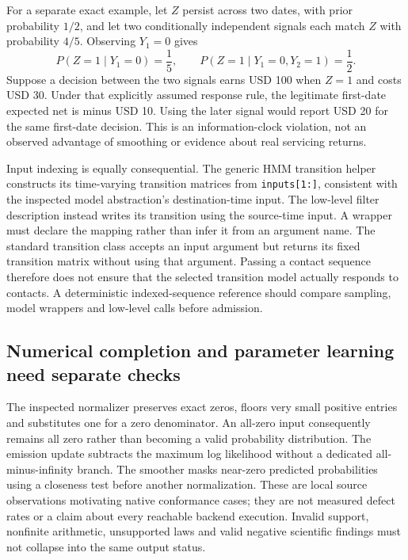 For a separate exact example, let $Z$ persist across two dates, with prior
probability $1/2$, and let two conditionally independent signals each match $Z$
with probability $4/5$. Observing $Y_1=0$ gives
\begin{equation}
 P(Z=1\mid Y_1=0)=\frac15,\qquad
 P(Z=1\mid Y_1=0,Y_2=1)=\frac12.
 \label{exec19:dynamax-filter}
\end{equation}
Suppose a decision between the two signals earns USD 100 when $Z=1$ and costs
USD 30. Under that explicitly assumed response rule, the legitimate first-date
expected net is minus USD 10. Using the later signal would report USD 20 for
the same first-date decision. This is an information-clock violation, not an
observed advantage of smoothing or evidence about real servicing returns.
\citep{exec19_dynamax_reference}

Input indexing is equally consequential. The generic HMM transition helper
constructs its time-varying transition matrices from \texttt{inputs[1:]},
consistent with the inspected model abstraction's destination-time input.
The low-level filter description instead writes its transition using the
source-time input. A wrapper must declare the mapping rather than infer it from
an argument name. The standard transition class accepts an input argument but
returns its fixed transition matrix without using that argument. Passing a
contact sequence therefore does not ensure that the selected transition model
actually responds to contacts. A deterministic indexed-sequence reference
should compare sampling, model wrappers and low-level calls before admission.
\citep{exec19_dynamax_source}

\subsection{Numerical completion and parameter learning need separate checks}
\label{exec19:dynamax-numerics}

The inspected normalizer preserves exact zeros, floors very small positive
entries and substitutes one for a zero denominator. An all-zero input consequently
remains all zero rather than becoming a valid probability distribution. The
emission update subtracts the maximum log likelihood without a dedicated
all-minus-infinity branch. The smoother masks near-zero predicted probabilities
using a closeness test before another normalization. These are local source
observations motivating native conformance cases; they are not measured defect
rates or a claim about every reachable backend execution. Invalid support,
nonfinite arithmetic, unsupported laws and valid negative scientific findings
must not collapse into the same output status.~\citep{exec19_dynamax_source}


